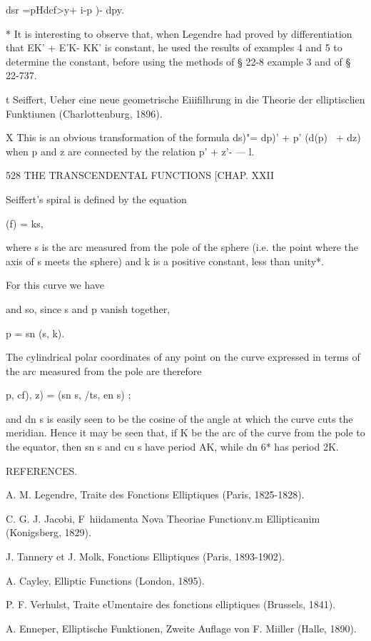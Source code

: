  dsr =pHdcf>y+ i-p )-  dpy. 

* It is interesting to observe that, when Legendre had proved by differentiation that 
EK' + E'K- KK' is constant, he used the results of examples 4 and 5 to determine the constant, 
before using the methods of § 22-8 example 3 and of § 22-737. 

t Seiffert, Ueher eine neue geometrische Eiiifilhrung in die Theorie der elliptisclien Funktiunen 
(Charlottenburg, 1896). 

X This is an obvious transformation of the formula  ds)"= dp)'  + p'  (d(p)~ +  dz)  when p and z 
are connected by the relation p'  + z'-  — l. 



528 THE TRANSCENDENTAL FUNCTIONS [CHAP. XXII 

Seiffert's spiral is defined by the equation 

(f) = ks, 

where s is the arc measured from the pole of the sphere (i.e. the point where the axis of s 
meets the sphere) and k is a positive constant, less than unity*. 

For this curve we have 

and so, since s and p vanish together, 

p = sn (s, k). 

The cylindrical polar coordinates of any point on the curve expressed in terms of the 
arc measured from the pole are therefore 

 p, cf), z) = (sn s, /ts, en s) ; 

and dn s is easily seen to be the cosine of the angle at which the curve cuts the meridian. 
Hence it may be seen that, if K be the arc of the curve from the pole to the equator, then 
sn s and cu s have period AK, while dn 6* has period 2K. 



REFERENCES. 

A. M. Legendre, Traite des Fonctions Elliptiques (Paris, 1825-1828). 

C. G. J. Jacobi, F\ hiidamenta Nova Theoriae Functionv.m Ellipticanim (Konigsberg, 
1829). 

J. Tannery et J. Molk, Fonctions Elliptiques (Paris, 1893-1902). 

A. Cayley, Elliptic Functions (London, 1895). 

P. F. Verhulst, Traite eUmentaire des fonctions elliptiques (Brussels, 1841). 

A. Enneper, Elliptische Funktionen, Zweite Auflage von F. Miiller (Halle, 1890). 

